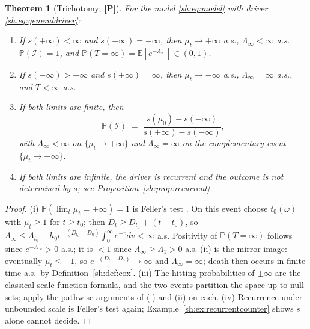\documentclass[11pt]{article}
\numberwithin{equation}{section}
\theoremstyle{plain}
\newtheorem{theorem}{Theorem}[section]
\theoremstyle{definition}
\theoremstyle{remark}
\newcommand{\E}{\mathbb{E}}
\newcommand{\PP}{\mathbb{P}}
\newcommand{\Imm}{\mathcal{I}}
\begin{document}
\begin{theorem}[Trichotomy; \textbf{[P]}]\label{sh:thm:trichotomy}
For the model \eqref{sh:eq:model} with driver
\eqref{sh:eq:generaldriver}:
\begin{enumerate}[label=\emph{(\roman*)},itemsep=1pt]
\item If $s(+\infty)<\infty$ and $s(-\infty)=-\infty$, then
$\mu_t\to+\infty$ a.s., $\Lambda_\infty<\infty$ a.s., $\PP(\Imm)=1$, and
$\PP(T=\infty)=\E[e^{-\Lambda_\infty}]\in(0,1)$.
\item If $s(-\infty)>-\infty$ and $s(+\infty)=\infty$, then
$\mu_t\to-\infty$ a.s., $\Lambda_\infty=\infty$ a.s., and $T<\infty$ a.s.
\item If both limits are finite, then
\begin{equation}\label{sh:eq:scaleformula}
\PP(\Imm)\;=\;\frac{s(\mu_0)-s(-\infty)}{s(+\infty)-s(-\infty)},
\end{equation}
with $\Lambda_\infty<\infty$ on $\{\mu_t\to+\infty\}$ and
$\Lambda_\infty=\infty$ on the complementary event
$\{\mu_t\to-\infty\}$.
\item If both limits are infinite, the driver is recurrent and the outcome
is \emph{not} determined by $s$; see
Proposition~\ref{sh:prop:recurrent}.
\end{enumerate}
\end{theorem}

\begin{proof}
(i) $\PP(\lim_t\mu_t=+\infty)=1$ is Feller's test \cite{KT81}. On this
event choose $t_0(\omega)$ with $\mu_t\ge1$ for $t\ge t_0$; then
$D_t\ge D_{t_0}+(t-t_0)$, so
$\Lambda_\infty\le\Lambda_{t_0}+h_0e^{-(D_{t_0}-D_0)}\int_0^\infty
e^{-v}dv<\infty$ a.s. Positivity of $\PP(T=\infty)$ follows since
$e^{-\Lambda_\infty}>0$ a.s.; it is $<1$ since $\Lambda_\infty\ge
\Lambda_1>0$ a.s. (ii) is the mirror image: eventually $\mu_t\le-1$, so
$e^{-(D_t-D_0)}\to\infty$ and $\Lambda_\infty=\infty$; death then occurs in
finite time a.s.\ by Definition~\ref{sh:def:cox}. (iii) The hitting
probabilities of $\pm\infty$ are the classical scale-function formula, and
the two events partition the space up to null sets; apply the pathwise
arguments of (i) and (ii) on each. (iv) Recurrence under unbounded scale is
Feller's test again; Example~\ref{sh:ex:recurrentcounter} shows $s$ alone
cannot decide.
\end{proof}
\end{document}
